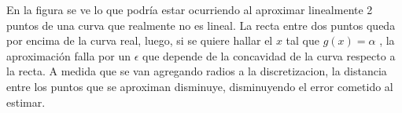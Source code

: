 En la figura se ve lo que podría estar ocurriendo al aproximar linealmente 2 puntos de una curva que realmente no es lineal. La recta entre dos puntos queda por encima de la curva real, luego, si se quiere hallar el $x$ tal que $g(x) = \alpha$ , la aproximación falla por un $\epsilon$ que depende de la concavidad de la curva respecto a la recta. A medida que se van agregando radios a la discretizacion, la distancia entre los puntos que se aproximan disminuye, disminuyendo el error cometido al estimar. 

